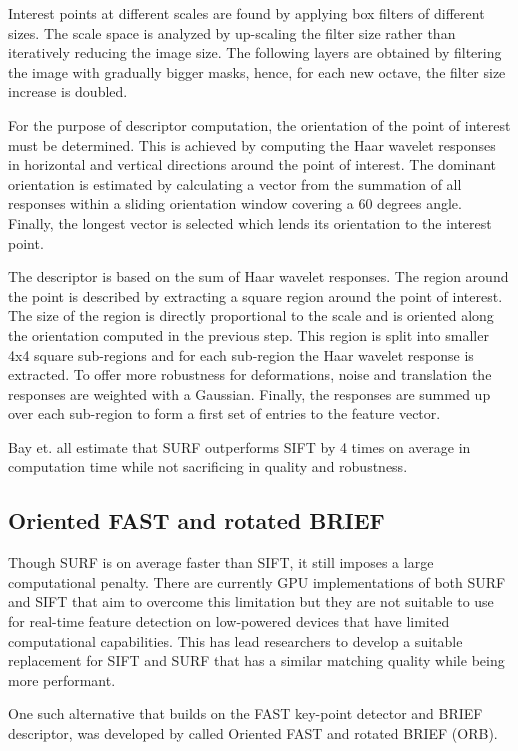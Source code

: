 \documentclass{l4proj}
\begin{document}
Interest points at different scales are found by applying box filters of different sizes. The scale space is analyzed by up-scaling the filter size rather than iteratively reducing the image size. The following layers are obtained by filtering the image with gradually bigger masks, hence, for each new octave, the filter size increase is doubled. 

For the purpose of descriptor computation, the orientation of the point of interest must be determined. This is achieved by computing the Haar wavelet responses in horizontal and vertical directions around the point of interest. The dominant orientation is estimated by calculating a vector from the summation of all responses within a sliding orientation window covering a 60 degrees angle. Finally, the longest vector is selected which lends its orientation to the interest point. 

The descriptor is based on the sum of Haar wavelet responses. The region around the point is described by extracting a square region around the point of interest. The size of the region is directly proportional to the scale and is oriented along the orientation computed in the previous step. This region is split into smaller 4x4 square sub-regions and for each sub-region the Haar wavelet response is extracted. To offer more robustness for deformations, noise and translation the responses are weighted with a Gaussian. Finally, the responses are summed up over each sub-region to form a first set of entries to the feature vector. 

Bay et. all estimate that SURF outperforms SIFT by 4 times on average in computation time while not sacrificing in quality and robustness.


\subsection{Oriented FAST and rotated BRIEF}

Though SURF is on average faster than SIFT, it still imposes a large computational penalty. There are currently GPU implementations of both SURF and SIFT that aim to overcome this limitation but they are not suitable to use for real-time feature detection on low-powered devices that have limited computational capabilities. This has lead researchers to develop a suitable replacement for SIFT and SURF that has a similar matching quality while being more performant. 

One such alternative that builds on the FAST key-point detector and BRIEF descriptor, was developed by \citet{Rublee:2011:OEA:2355573.2356268} called Oriented FAST and rotated BRIEF (ORB).
\end{document}
